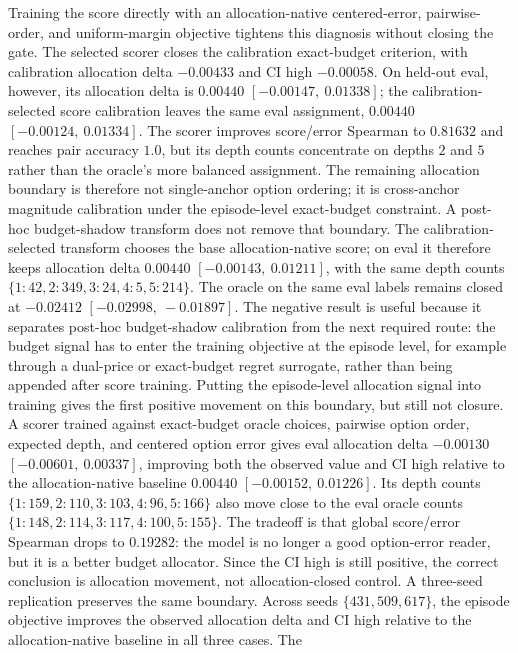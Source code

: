 Training the score directly with an allocation-native centered-error,
pairwise-order, and uniform-margin objective tightens this diagnosis without
closing the gate.  The selected scorer closes the calibration exact-budget
criterion, with calibration allocation delta $-0.00433$ and CI high
$-0.00058$.  On held-out eval, however, its allocation delta is $0.00440$
$[-0.00147,\ 0.01338]$; the calibration-selected score calibration leaves the
same eval assignment, $0.00440$ $[-0.00124,\ 0.01334]$.  The scorer improves
score/error Spearman to $0.81632$ and reaches pair accuracy $1.0$, but its depth
counts concentrate on depths $2$ and $5$ rather than the oracle's more balanced
assignment.  The remaining allocation boundary is therefore not single-anchor
option ordering; it is cross-anchor magnitude calibration under the
episode-level exact-budget constraint.
A post-hoc budget-shadow transform does not remove that boundary.  The
calibration-selected transform chooses the base allocation-native score; on
eval it therefore keeps allocation delta $0.00440$ $[-0.00143,\ 0.01211]$,
with the same depth counts $\{1:42,2:349,3:24,4:5,5:214\}$.  The oracle on the
same eval labels remains closed at $-0.02412$ $[-0.02998,\ -0.01897]$.  The
negative result is useful because it separates post-hoc budget-shadow
calibration from the next required route: the budget signal has to enter the
training objective at the episode level, for example through a dual-price or
exact-budget regret surrogate, rather than being appended after score training.
Putting the episode-level allocation signal into training gives the first
positive movement on this boundary, but still not closure.  A scorer trained
against exact-budget oracle choices, pairwise option order, expected depth, and
centered option error gives eval allocation delta $-0.00130$
$[-0.00601,\ 0.00337]$, improving both the observed value and CI high relative
to the allocation-native baseline $0.00440$ $[-0.00152,\ 0.01226]$.  Its depth
counts $\{1:159,2:110,3:103,4:96,5:166\}$ also move close to the eval oracle
counts $\{1:148,2:114,3:117,4:100,5:155\}$.  The tradeoff is that global
score/error Spearman drops to $0.19282$: the model is no longer a good
option-error reader, but it is a better budget allocator.  Since the CI high is
still positive, the correct conclusion is allocation movement, not
allocation-closed control.
A three-seed replication preserves the same boundary.  Across seeds
$\{431,509,617\}$, the episode objective improves the observed allocation delta
and CI high relative to the allocation-native baseline in all three cases.  The
